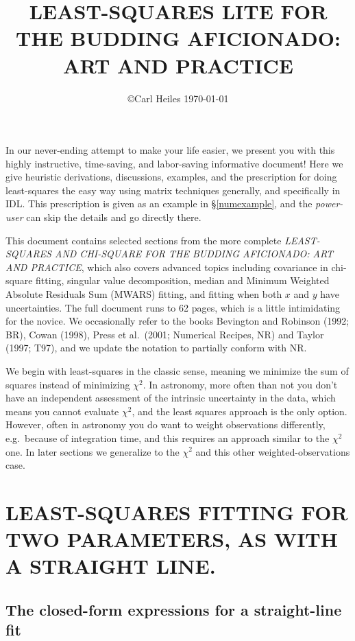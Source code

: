 \documentclass[psfig,preprint]{aastex}
\begin{document}
\setcounter{section}{-1}

\title{LEAST-SQUARES LITE FOR THE BUDDING AFICIONADO: \\ 
ART AND PRACTICE } 

\author{\copyright Carl Heiles \today }

	In our never-ending attempt to make your life easier, we present
you with this highly instructive, time-saving, and labor-saving
informative document! Here we give heuristic derivations, discussions,
examples, and the prescription for doing least-squares the easy way
using matrix techniques generally, and specifically in IDL.  This
prescription is given as an example in \S\ref{numexample},  and the {\it
power-user} can skip the details and go directly there.  

	This document contains selected sections from the more complete
{\it LEAST-SQUARES AND CHI-SQUARE FOR THE BUDDING AFICIONADO: ART AND
PRACTICE}, which also covers advanced topics including covariance in
chi-square fitting, singular value decomposition, median and Minimum
Weighted Absolute Residuals Sum (MWARS) fitting, and fitting when both
$x$ and $y$ have uncertainties.  The full document runs to 62 pages,
which is a little intimidating for the novice.  We occasionally refer to
the books Bevington and Robinson (1992; BR), Cowan (1998), Press et al.\
(2001; Numerical Recipes, NR) and Taylor (1997; T97), and we update the
notation to partially conform with NR. 

	We begin with least-squares in the classic sense, meaning we
minimize the sum of squares instead of minimizing $\chi^2$.   In
astronomy,  more often than not you don't have an independent assessment
of the intrinsic uncertainty in the data, which means you cannot
evaluate $\chi^2$, and the least squares  approach is the only option.
However, often in astronomy you do want to weight observations
differently, e.g.\ because of integration time, and this requires an
approach similar to the $\chi^2$ one. In later sections we generalize to
the $\chi^2$ and this other weighted-observations case.

\tableofcontents

\section{LEAST-SQUARES FITTING FOR TWO PARAMETERS, AS WITH A STRAIGHT
LINE.} \label{sectionone}

\subsection{The closed-form expressions for a straight-line fit}
\end{document}
